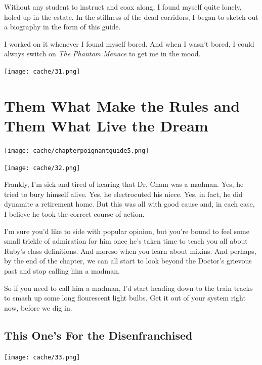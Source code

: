 \documentclass[12pt,twoside]{report}
\begin{document}
Without any student to instruct and coax along, I found myself quite
lonely, holed up in the estate.  In the stillness of the dead
corridors, I began to sketch out a biography in the form of this
guide.

I worked on it whenever I found myself bored.  And when I wasn't
bored, I could always switch on {\em The Phantom Menace} to get me in
the mood.

	\texttt{[image: cache/31.png]}

\newpage
\thispagestyle{empty}
\mbox{}

\newpage
\thispagestyle{empty}
\mbox{}


\cleartooddpage




\chapter{Them What Make the Rules and Them What Live the Dream}
\vfill
\begin{center}
  \texttt{[image: cache/chapterpoignantguide5.png]}
\end{center}
\vspace{4.6cm}
\newpage
\thispagestyle{empty}
\mbox{}
\clearpage
	\texttt{[image: cache/32.png]}

Frankly, I'm sick and tired of hearing that Dr. Cham was a madman.
Yes, he tried to bury himself alive.  Yes, he electrocuted his niece.
Yes, in fact, he did dynamite a retirement home.  But this was all
with good cause and, in each case, I believe he took the correct
course of action.

I'm sure you'd like to side with popular opinion, but you're bound to
feel some small trickle of admiration for him once he's taken time to
teach you all about Ruby's class definitions. And moreso when you
learn about mixins.  And perhaps, by the end of the chapter, we can
all start to look beyond the Doctor's grievous past and stop calling
him a madman.

So if you need to call him a madman, I'd start heading down to the
train tracks to smash up some long flourescent light bulbs.  Get it
out of your system right now, before we dig in.


\section{This One's For the Disenfranchised}


	\texttt{[image: cache/33.png]}
\end{document}
